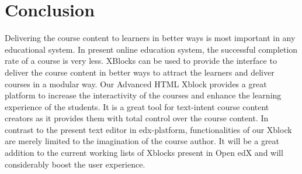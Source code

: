 \chapter{Conclusion}
Delivering the course content to learners in better ways is most important in any educational system.
In present online education system, the successful completion rate of a course is very less.
XBlocks can be used to provide the  interface to deliver the course content in better ways to
attract the learners and deliver courses in a modular way.
\newline
\newline
Our Advanced HTML Xblock provides a great platform to increase the  interactivity of the courses and
enhance the learning experience of the students. It is a great tool for text-intent course content
creators as it provides them with total control over the course content. In contrast to the present text
editor in edx-platform, functionalities of our Xblock are merely limited to the imagination of the
course author. It will be a great addition to the current working lists of Xblocks present in Open edX
and will considerably boost the user experience.